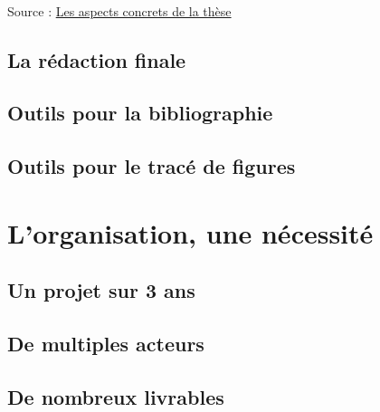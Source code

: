 \documentclass[a4paper,12pt]{report}
\begin{document}
\ \\

Source : \href{https://act.hypotheses.org/504}{Les aspects concrets de la thèse}

\FloatBarrier
\subsection{La rédaction finale}



\FloatBarrier
\subsection{Outils pour la bibliographie}



\FloatBarrier
\subsection{Outils pour le tracé de figures}





\FloatBarrier
\newpage
\section{L'organisation, une nécessité}
\subsection{Un projet sur 3 ans}



\FloatBarrier
\subsection{De multiples acteurs}



\FloatBarrier
\subsection{De nombreux livrables}
\end{document}
